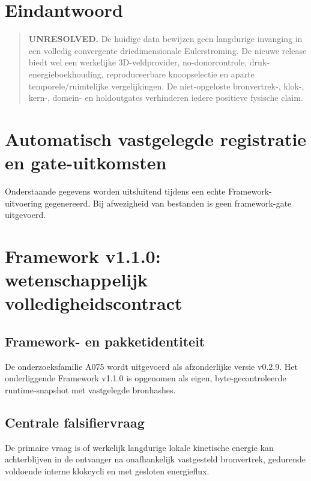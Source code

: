 \documentclass[10pt,a4paper]{article}
\begin{document}
\section{Eindantwoord}
\begin{quote}\textbf{UNRESOLVED.} De huidige data bewijzen geen langdurige invanging in een volledig convergente driedimensionale Eulerstroming. De nieuwe release biedt wel een werkelijke 3D-veldprovider, no-donorcontrole, druk-energieboekhouding, reproduceerbare knoopselectie en aparte temporele/ruimtelijke vergelijkingen. De niet-opgeloste bronvertrek-, klok-, kern-, domein- en holdoutgates verhinderen iedere positieve fysische claim.\end{quote}
\section{Automatisch vastgelegde registratie en gate-uitkomsten}
Onderstaande gegevens worden uitsluitend tijdens een echte Framework-uitvoering gegenereerd.
Bij afwezigheid van bestanden is geen framework-gate uitgevoerd.

\section{Framework v1.1.0: wetenschappelijk volledigheidscontract}
\subsection{Framework- en pakketidentiteit}
De onderzoeksfamilie A075 wordt uitgevoerd als afzonderlijke versie v0.2.9. Het onderliggende Framework v1.1.0 is opgenomen als eigen, byte-gecontroleerde runtime-snapshot met vastgelegde bronhashes.
\subsection{Centrale falsifiervraag}
De primaire vraag is of werkelijk langdurige lokale kinetische energie kan achterblijven in de ontvanger na onafhankelijk vastgesteld bronvertrek, gedurende voldoende interne klokcycli en met gesloten energieflux.
\end{document}
